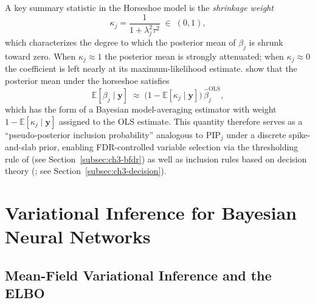A key summary statistic in the Horseshoe model is the \emph{shrinkage weight}
\begin{equation}
  \kappa_j = \frac{1}{1 + \lambda_j^2 \tau^2} \;\in\; (0, 1),
  \label{eq:kappaj}
\end{equation}
which characterizes the degree to which the posterior mean of
$\beta_j$ is shrunk toward zero.  When $\kappa_j \approx 1$ the
posterior mean is strongly attenuated; when $\kappa_j \approx 0$
the coefficient is left nearly at its maximum-likelihood estimate.
\citet{carvalho_handling_2009} show that the posterior mean under
the horseshoe satisfies
\begin{equation}
  \mathbb{E}[\beta_j \mid \mathbf{y}]
  \;\approx\;
  \bigl(1 - \mathbb{E}[\kappa_j \mid \mathbf{y}]\bigr)\,
  \hat{\beta}_j^{\mathrm{OLS}},
  \label{eq:hs-post-mean}
\end{equation}
which has the form of a Bayesian model-averaging estimator with
weight $1 - \mathbb{E}[\kappa_j \mid \mathbf{y}]$ assigned to
the OLS estimate.  This quantity therefore serves as a
``pseudo-posterior inclusion probability'' analogous to
$\mathrm{PIP}_j$ under a discrete spike-and-slab prior,
enabling FDR-controlled variable selection via the thresholding
rule of \citet{bernardo_fdr_2007} (see
Section~\ref{subsec:ch3-bfdr}) as well as inclusion rules 
based on decision theory (\citet{guindani_bayesian_2009}; see Section~\ref{subsec:ch3-decision}).




\section{Variational Inference for Bayesian Neural Networks}
\label{sec:ch3-vi}

\subsection{Mean-Field Variational Inference and the ELBO}
\label{subsec:ch3-elbo}

